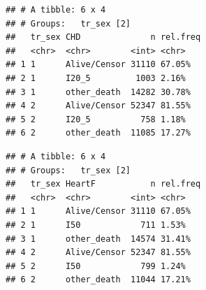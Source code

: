 \documentclass[]{article}
\newenvironment{Shaded}{\begin{snugshade}}{\end{snugshade}}
\newcommand{\DataTypeTok}[1]{\textcolor[rgb]{0.13,0.29,0.53}{#1}}
\newcommand{\DecValTok}[1]{\textcolor[rgb]{0.00,0.00,0.81}{#1}}
\newcommand{\KeywordTok}[1]{\textcolor[rgb]{0.13,0.29,0.53}{\textbf{#1}}}
\newcommand{\NormalTok}[1]{#1}
\newcommand{\OperatorTok}[1]{\textcolor[rgb]{0.81,0.36,0.00}{\textbf{#1}}}
\newcommand{\StringTok}[1]{\textcolor[rgb]{0.31,0.60,0.02}{#1}}
\begin{document}
\begin{Shaded}
\end{Shaded}

\begin{verbatim}
## # A tibble: 6 x 4
## # Groups:   tr_sex [2]
##   tr_sex CHD              n rel.freq
##   <chr>  <chr>        <int> <chr>   
## 1 1      Alive/Censor 31110 67.05%  
## 2 1      I20_5         1003 2.16%   
## 3 1      other_death  14282 30.78%  
## 4 2      Alive/Censor 52347 81.55%  
## 5 2      I20_5          758 1.18%   
## 6 2      other_death  11085 17.27%
\end{verbatim}

\begin{Shaded}
\end{Shaded}

\begin{verbatim}
## # A tibble: 6 x 4
## # Groups:   tr_sex [2]
##   tr_sex HeartF           n rel.freq
##   <chr>  <chr>        <int> <chr>   
## 1 1      Alive/Censor 31110 67.05%  
## 2 1      I50            711 1.53%   
## 3 1      other_death  14574 31.41%  
## 4 2      Alive/Censor 52347 81.55%  
## 5 2      I50            799 1.24%   
## 6 2      other_death  11044 17.21%
\end{verbatim}
\end{document}
